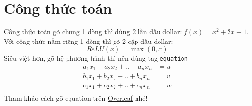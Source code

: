 \section{Công thức toán}
Công thức toán gõ chung 1 dòng thì dùng 2 lần dấu dollar: $f(x) = x^2 + 2x + 1$. Với công thức nằm riêng 1 dòng thì gõ 2 cặp dấu dollar:
$$
ReLU(x) = \max(0, x)
$$
Siêu việt hơn, gõ hệ phương trình thì nên dùng tag \texttt{equation}
\begin{equation*}
\begin{aligned}
a_1x_1 + a_2x_2 + .. + a_nx_n &= u \\
b_1x_1 + b_2x_2 + .. + b_nx_n &= v \\
c_1x_1 + c_2x_2 + .. + c_nx_n &= w \\
\end{aligned}
\end{equation*}
Tham khảo cách gõ equation trên \href{https://www.overleaf.com/learn/latex/Mathematical_expressions}{Overleaf} nhé!